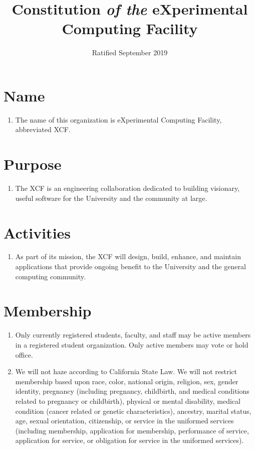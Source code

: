 \documentclass[english,a4paper]{article}
\title{Constitution \textit{of the} eXperimental Computing Facility\vspace{-3ex}}
\date{Ratified September 2019\vspace{-3ex}}
\begin{document}
\maketitle

\section{Name}
\begin{enumerate}
\item The name of this organization is eXperimental Computing Facility,
  abbreviated XCF.
\end{enumerate}
\section{Purpose}

\begin{enumerate}
\item The XCF is an engineering collaboration dedicated to building visionary,
  useful software for the University and the community at large.
\end{enumerate}


\section{Activities}


\begin{enumerate}
\item As part of its mission, the XCF will design, build, enhance, and
  maintain applications that provide ongoing benefit to the University
  and the general computing community.
\end{enumerate}

\section{Membership}

\begin{enumerate}
\item Only currently registered students, faculty, and staff may be active
  members in a registered student organization. Only active members may vote
  or hold office.

\item We will not haze according to California State Law. We will not restrict
  membership based upon race, color, national origin, religion, sex,
  gender identity, pregnancy (including pregnancy, childbirth, and medical
  conditions related to pregnancy or childbirth), physical or mental
  disability, medical condition (cancer related or genetic characteristics),
  ancestry, marital status, age, sexual orientation, citizenship, or
  service in the uniformed services (including membership, application
  for membership, performance of service, application for service, or
  obligation for service in the uniformed services).
\end{enumerate}
\end{document}
